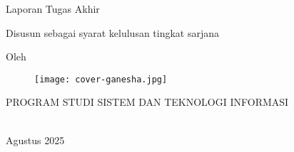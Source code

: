 \clearpage
\pagestyle{empty}

\begin{center}
	\smallskip

	\fontsize{16}{19.2}\selectfont\bfseries {\thetitle}
	\vfill

	\Large Laporan Tugas Akhir
	\vfill

	\large Disusun sebagai syarat kelulusan tingkat sarjana
	\vfill

	\large Oleh

	\Large \theauthor

	\vfill
	\begin{figure}[ht]
		\centering
		\texttt{[image: cover-ganesha.jpg]}
	\end{figure}
	\vfill

	\large
	\uppercase{
		Program Studi Sistem dan Teknologi Informasi \\
		\MakeUppercase{\steifull \\ \itbfull}
	}

	Agustus 2025

\end{center}

\clearpage
